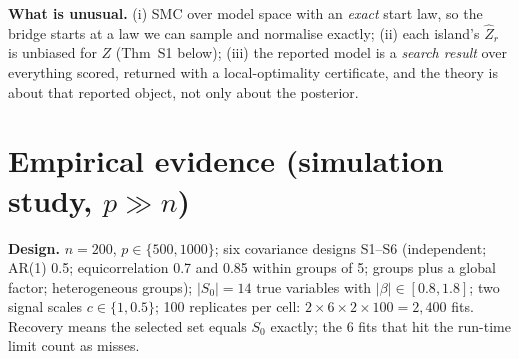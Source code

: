 \documentclass[10pt]{article}
\begin{document}
\textbf{What is unusual.} (i) SMC over model space with an \emph{exact} start law, so the bridge starts at a law we can sample and normalise exactly; (ii) each island's $\hat Z_r$ is unbiased for $Z$ (Thm~S1 below); (iii) the reported model is a \emph{search result} over everything scored, returned with a local-optimality certificate, and the theory is about that reported object, not only about the posterior.

\section{Empirical evidence (simulation study, \texorpdfstring{$p\gg n$}{p >> n})}

\textbf{Design.} $n=200$, $p\in\{500,1000\}$; six covariance designs S1--S6 (independent; AR(1) 0.5; equicorrelation 0.7 and 0.85 within groups of 5; groups plus a global factor; heterogeneous groups);
$|S_0|=14$ true variables with $|\beta|\in[0.8,1.8]$; two signal scales $c\in\{1,0.5\}$; 100 replicates per cell: $2\times6\times2\times100=2{,}400$ fits.
Recovery means the selected set equals $S_0$ exactly; the 6 fits that hit the run-time limit count as misses.
\end{document}
